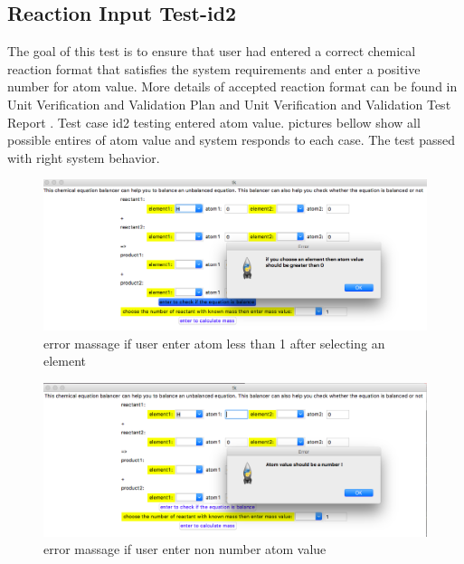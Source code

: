 \documentclass[12pt, titlepage]{article}
\begin{document}
\subsection{Reaction Input Test-id2}
The goal of this test is to ensure that user had entered a correct chemical reaction format that satisfies the system requirements and enter a positive number for atom value. More details of accepted reaction format can be found in Unit Verification and Validation Plan \cite{UnitVnVPlan}  and Unit Verification and Validation Test Report \cite{VnVReport}. Test case id2 testing entered atom value. pictures bellow show all possible entires of atom value and system responds to each case. The test passed with right system behavior. 

\begin{figure}[h!]
 \begin{center}
 \includegraphics [width=\textwidth]{atomnegative}
 \caption{\label{ Figure 3:} error massage if user enter atom less than 1 after selecting an element}
 \end{center}
 \end{figure}
 
 \begin{figure}[h!]
 \begin{center}
 \includegraphics [width=\textwidth]{atomnotnumber}
 \caption{\label{ Figure 4:} error massage if user enter non number atom value}
 \end{center}
 \end{figure}
\end{document}
